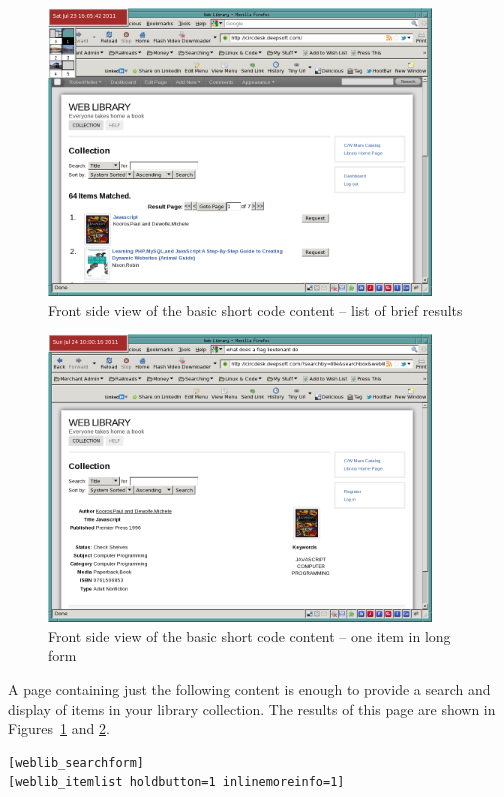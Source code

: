 \documentclass[letterpaper,twoside]{article}
\begin{document}
\begin{figure}[htbp]
\begin{centering}
\includegraphics[width=4in]{frontside.png}
\caption{Front side view of the basic short code content -- list of brief results}
\label{fig:frontside}
\end{centering}
\end{figure}
\begin{figure}[htbp]
\begin{centering}
\includegraphics[width=4in]{frontone.png}
\caption{Front side view of the basic short code content -- one item in long form}
\label{fig:frontone}
\end{centering}
\end{figure}
A page containing just the following content is enough to provide a
search and display of items in your library collection. The results of
this page are shown in Figures~\ref{fig:frontside} and \ref{fig:frontone}.

\begin{verbatim}
[weblib_searchform]
[weblib_itemlist holdbutton=1 inlinemoreinfo=1]
\end{verbatim}
\end{document}
